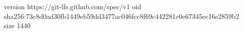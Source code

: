 version https://git-lfs.github.com/spec/v1
oid sha256:73c8d0ad30fb1449eb59dd3477ac046fcc8f69c442281c0e67345ec16e2859b2
size 1440
